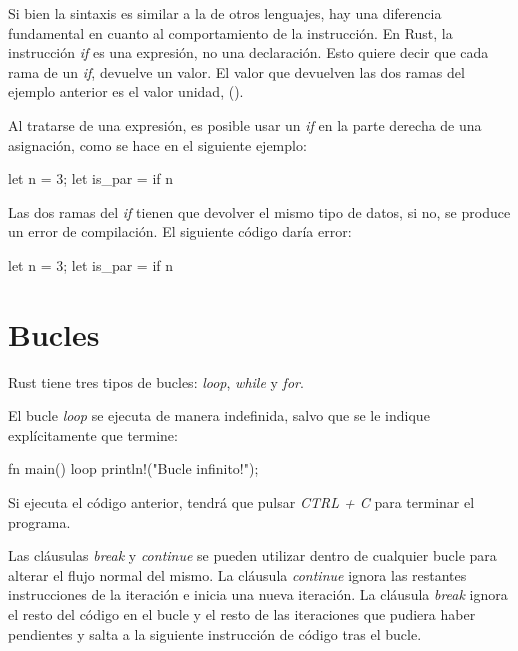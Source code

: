 \vspace{0.7em}

Si bien la sintaxis es similar a la de otros lenguajes, hay una diferencia fundamental en cuanto al comportamiento de la instrucción. En Rust, la instrucción \textit{if} es una expresión, no una declaración. Esto quiere decir que cada rama de un \textit{if}, devuelve un valor. El valor que devuelven las dos ramas del ejemplo anterior es el valor unidad, (). 

Al tratarse de una expresión, es posible usar un \textit{if} en la parte derecha de una asignación, como se hace en el siguiente ejemplo:

\vspace{0.7em}
\begin{Codigo}
let n = 3;
let is_par = if n%
\end{Codigo}

Las dos ramas del \textit{if} tienen que devolver el mismo tipo de datos, si no, se produce un error de compilación. El siguiente código daría error:

\vspace{0.7em}
\begin{Codigo}
let n = 3;
let is_par = if n%
\end{Codigo}


\section{Bucles}
\label{sec_bucles}
Rust tiene tres tipos de bucles: \textit{loop}, \textit{while} y \textit{for}.

El bucle \textit{loop} se ejecuta de manera indefinida, salvo que se le indique explícitamente que termine:

\vspace{0.7em}
\begin{Codigo}
fn main() {
   loop {
      println!("Bucle infinito!");
   }
}
\end{Codigo}

Si ejecuta el código anterior, tendrá que pulsar \textit{CTRL + C} para terminar el programa.

Las cláusulas \textit{break} y \textit{continue} se pueden utilizar dentro de cualquier bucle para alterar el flujo normal del mismo. La cláusula \textit{continue} ignora las restantes instrucciones de la iteración e inicia una nueva iteración. La cláusula \textit{break} ignora el resto del código en el bucle y el resto de las iteraciones que pudiera haber pendientes y salta a la siguiente instrucción de código tras el bucle.

